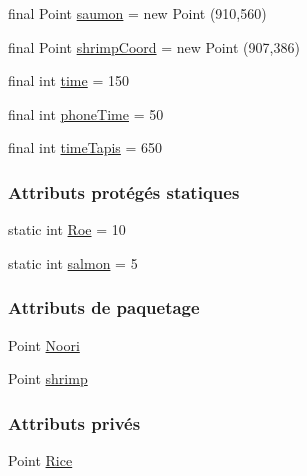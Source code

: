 \begin{DoxyCompactItemize}
\item 
final Point \hyperlink{classTestSushi_1_1src_1_1Suchi_1_1Recette_a855a7ed217eec3565619156fa6cd4214}{saumon} = new Point (910,560)
\item 
final Point \hyperlink{classTestSushi_1_1src_1_1Suchi_1_1Recette_a69faeadec2c0d475bbd77c3b7eeaada7}{shrimp\+Coord} = new Point (907,386)
\item 
final int \hyperlink{classTestSushi_1_1src_1_1Suchi_1_1Recette_a2c78759553661a7e4b01d4ac1212ec6c}{time} = 150
\item 
final int \hyperlink{classTestSushi_1_1src_1_1Suchi_1_1Recette_a0d95a4a68ee0d423b6815b296f3304b2}{phone\+Time} = 50
\item 
final int \hyperlink{classTestSushi_1_1src_1_1Suchi_1_1Recette_a7db8ec6383e36487bc7ca0490edd0b4a}{time\+Tapis} = 650
\end{DoxyCompactItemize}
\subsubsection*{Attributs protégés statiques}
\begin{DoxyCompactItemize}
\item 
static int \hyperlink{classTestSushi_1_1src_1_1Suchi_1_1Recette_ab4ceb10875120aaae2ade481b6088c6d}{Roe} = 10
\item 
static int \hyperlink{classTestSushi_1_1src_1_1Suchi_1_1Recette_a726a712fe936ef2a96982e00d21c49c0}{salmon} = 5
\end{DoxyCompactItemize}
\subsubsection*{Attributs de paquetage}
\begin{DoxyCompactItemize}
\item 
Point \hyperlink{classTestSushi_1_1src_1_1Suchi_1_1ShrimpSh_ad98e558200f26210480dbe1b090bfcab}{Noori}
\item 
Point \hyperlink{classTestSushi_1_1src_1_1Suchi_1_1ShrimpSh_acf925cad69a60c4d9cf17d3a5124557d}{shrimp}
\end{DoxyCompactItemize}
\subsubsection*{Attributs privés}
\begin{DoxyCompactItemize}
\item 
Point \hyperlink{classTestSushi_1_1src_1_1Suchi_1_1ShrimpSh_adc0f2476b56f73ec22bc38f824a997f5}{Rice}
\end{DoxyCompactItemize}


